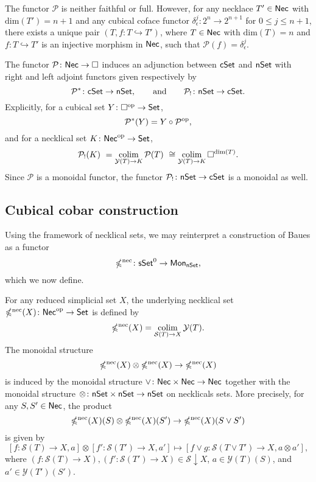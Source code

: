 \begin{remark}
	The functor $\mathcal{P}$ is neither faithful or full.
	However, for any necklace $T' \in \mathsf{Nec}$ with $\text{dim}(T')=n+1$ and any cubical coface functor $\delta_{\epsilon}^j \colon 2^n \to 2^{n+1}$ for $0 \leq j \leq n+1$, there exists a unique pair $(T, f \colon T \hookrightarrow T')$, where $T \in \mathsf{Nec}$ with $\text{dim}(T)=n$ and $f \colon T \hookrightarrow T'$ is an injective morphism in $\mathsf{Nec}$, such that $\mathcal{P}(f) = \delta_{\epsilon}^j $.
\end{remark}

The functor $\mathcal{P} \colon \mathsf{Nec} \to \square$ induces an adjunction between $\mathsf{cSet}$ and $\mathsf{nSet}$ with right and left adjoint functors given respectively by
\begin{equation*}
\mathcal{P}^\ast \colon \mathsf{cSet} \to \mathsf{nSet},
\qquad \text{and} \qquad
\mathcal{P}_{!}  \colon \mathsf{nSet} \to \mathsf{cSet}.
\end{equation*}
Explicitly, for a cubical set $Y \colon \square^{\mathrm{op}} \to \mathsf{Set}$,
\begin{equation*}
\mathcal{P}^\ast(Y)= Y \circ \mathcal{P}^{\mathrm{op}},
\end{equation*}
and for a necklical set $K \colon \mathsf{Nec}^{\mathrm{op}} \to \mathsf{Set}$,
\begin{equation*}
\mathcal{P}_{!}(K) \ =
\operatorname*{colim}_{\mathcal{Y}(T) \to K} \mathcal{P}(T) \ \cong 
\operatorname*{colim}_{\mathcal{Y}(T) \to K} \square^{\text{dim}(T)}.
\end{equation*}
Since $\mathcal{P}$ is a monoidal functor, the functor $\mathcal{P}_{!} \colon \mathsf{nSet} \to \mathsf{cSet}$ is a monoidal as well.

\subsection{Cubical cobar construction}

Using the framework of necklical sets, we may reinterpret a construction of Baues as a functor
\begin{equation*}
\operatorname{\mathbb{\Omega}^{\mathrm{nec}}} \colon \mathsf{sSet}^0 \to \mathsf{Mon}_{\mathsf{nSet}},
\end{equation*}
which we now define.

For any reduced simplicial set $X$, the underlying necklical set $\operatorname{\mathbb{\Omega}^{\mathrm{nec}}}(X) \colon \mathsf{Nec}^{\mathrm{op}} \to \mathsf{Set}$ is defined by
\begin{equation*}
\operatorname{\mathbb{\Omega}^{\mathrm{nec}}}(X) = \operatorname*{colim}_{\mathcal{S}(T) \to X} \mathcal{Y}(T).
\end{equation*}
The monoidal structure
$$\operatorname{\mathbb{\Omega}^{\mathrm{nec}}}(X) \otimes \operatorname{\mathbb{\Omega}^{\mathrm{nec}}}(X) \to \operatorname{\mathbb{\Omega}^{\mathrm{nec}}}(X)$$
is induced by the monoidal structure $\vee \colon \mathsf{Nec} \times \mathsf{Nec} \to \mathsf{Nec}$ together with the monoidal structure $\otimes \colon \mathsf{nSet} \times \mathsf{nSet} \to \mathsf{nSet}$ on necklicals sets.
More precisely, for any $S, S' \in \mathsf{Nec}$, the product $$\operatorname{\mathbb{\Omega}^{\mathrm{nec}}}(X)(S) \otimes \operatorname{\mathbb{\Omega}^{\mathrm{nec}}}(X)(S') \to \operatorname{\mathbb{\Omega}^{\mathrm{nec}}}(X)(S \vee S')$$ is given by $$[f\colon \mathcal{S}(T) \to X, a] \otimes [f'\colon \mathcal{S}(T') \to X, a'] \mapsto [f \vee g\colon \mathcal{S}(T\vee T') \to X, a \otimes  a'],$$
where $(f\colon \mathcal{S}(T) \to X), (f'\colon \mathcal{S}(T') \to X) \in \mathcal{S} \downarrow X$, $a\in \mathcal{Y}(T)(S)$, and $a'\in \mathcal{Y}(T')(S')$.

